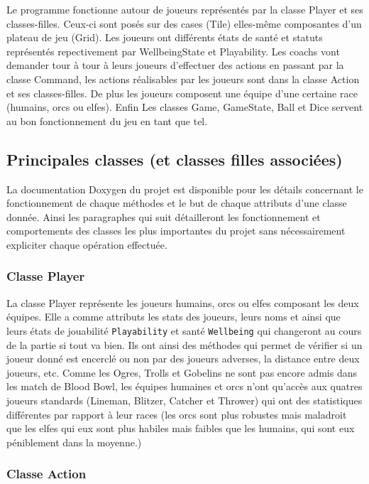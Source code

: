 \documentclass{article}
\newcommand{\info}{\texttt}
\begin{document}
        Le programme fonctionne autour de joueurs représentés par la classe Player et ses classes-filles. Ceux-ci sont posés sur des cases (Tile) elles-même composantes d'un plateau de jeu (Grid). Les joueurs ont différents états de santé et statuts représentés repectivement par WellbeingState et Playability. Les coachs vont demander tour à tour à leurs joueurs d'effectuer des actions en passant par la classe Command, les actions réalisables par les joueurs sont dans la classe Action et ses classes-filles. De plus les joueurs composent une équipe d'une certaine race (humains, orcs ou elfes). Enfin Les classes Game, GameState, Ball et Dice servent au bon fonctionnement du jeu en tant que tel.

    \subsection{Principales classes (et classes filles associées)}
        
        La documentation Doxygen du projet est disponible pour les détails concernant le fonctionnement de chaque méthodes et le but de chaque attributs d'une classe donnée. Ainsi les paragraphes qui suit détailleront les fonctionnement et comportements des classes les plus importantes du projet sans nécessairement expliciter chaque opération effectuée.
        
        \subsubsection{Classe Player}
        
            La classe Player représente les joueurs humains, orcs ou elfes composant les deux équipes. Elle a comme attributs les stats des joueurs, leurs noms et ainsi que leurs états de jouabilité \info{Playability} et santé \info{Wellbeing} qui changeront au cours de la partie si tout va bien. Ils ont ainsi des méthodes qui permet de vérifier si un joueur donné est encerclé ou non par des joueurs adverses, la distance entre deux joueurs, etc. Comme les Ogres, Trolls et Gobelins ne sont pas encore admis dans les match de Blood Bowl, les équipes humaines et orcs n'ont qu'accès aux quatres joueurs standards (Lineman, Blitzer, Catcher et Thrower) qui ont des statistiques différentes par rapport à leur races (les orcs sont plus robustes mais maladroit que les elfes qui eux sont plus habiles mais faibles que les humains, qui sont eux péniblement dans la moyenne.)
        
        \subsubsection{Classe Action}
        
\end{document}
